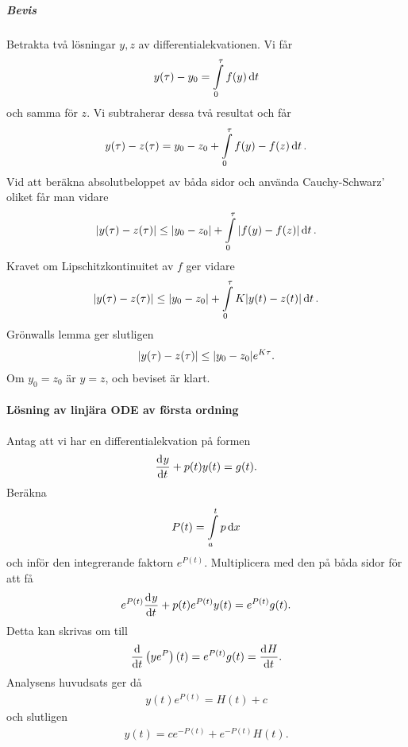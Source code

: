 \subparagraph{Bevis}
Betrakta två lösningar $y, z$ av differentialekvationen. Vi får
\begin{align*}
	y(\tau) - y_{0} = \int\limits_{0}^{\tau}f(y)\dd{t}
\end{align*}
och samma för $z$. Vi subtraherar dessa två resultat och får
\begin{align*}
	y(\tau) - z(\tau) = y_{0} - z_{0} + \int\limits_{0}^{\tau}f(y) - f(z)\dd{t}.
\end{align*}
Vid att beräkna absolutbeloppet av båda sidor och använda Cauchy-Schwarz' oliket får man vidare
\begin{align*}
	\abs{y(\tau) - z(\tau)} \leq \abs{y_{0} - z_{0}} + \int\limits_{0}^{\tau}\abs{f(y) - f(z)}\dd{t}.
\end{align*}
Kravet om Lipschitzkontinuitet av $f$ ger vidare
\begin{align*}
	\abs{y(\tau) - z(\tau)} \leq \abs{y_{0} - z_{0}} + \int\limits_{0}^{\tau}K\abs{y(t) - z(t)}\dd{t}.
\end{align*}
Grönwalls lemma ger slutligen
\begin{align*}
	\abs{y(\tau) - z(\tau)} \leq \abs{y_{0} - z_{0}}e^{K\tau}.
\end{align*}
Om $y_{0} = z_{0}$ är $y = z$, och beviset är klart.

\paragraph{Lösning av linjära ODE av första ordning}
Antag att vi har en differentialekvation på formen
\begin{align*}
	\dv[]{y}{t} (t) + p(t)y(t) = g(t).
\end{align*}
Beräkna
\begin{align*}
	P(t) = \int\limits_{a}^{t}p\dd{x}
\end{align*}
och inför den integrerande faktorn $e^{P(t)}$. Multiplicera med den på båda sidor för att få
\begin{align*}
	e^{P(t)}\dv[]{y}{t} (t) + p(t)e^{P(t)}y(t) = e^{P(t)}g(t).
\end{align*}
Detta kan skrivas om till
\begin{align*}
	\dv{t}\left(ye^{P}\right)(t) = e^{P(t)}g(t) = \dv[]{H}{t} (t).
\end{align*}
Analysens huvudsats ger då
\begin{align*}
	y(t)e^{P(t)} = H(t) + c
\end{align*}
och slutligen
\begin{align*}
	y(t) = ce^{-P(t)} + e^{-P(t)}H(t).
\end{align*}

